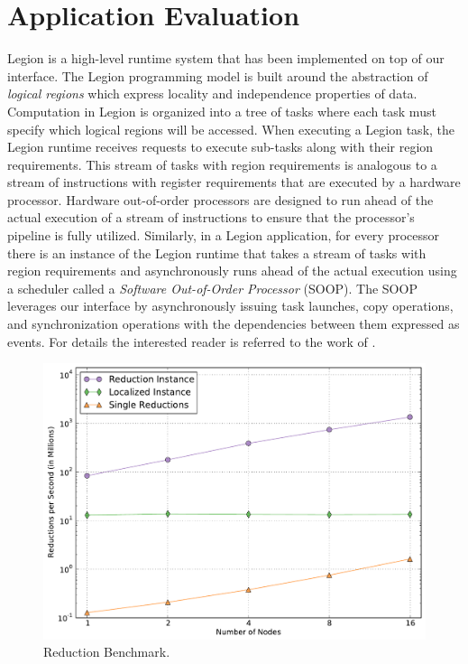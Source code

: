 
\section{Application Evaluation}
\label{sec:apps}
Legion\cite{Legion12} is a high-level runtime system that has been implemented on top
of our interface.  
The Legion programming model is built around the abstraction of 
{\em logical regions} which express locality and independence properties 
of data.  Computation in Legion is organized into a tree of tasks where 
each task must specify which logical regions will be accessed.
When executing a Legion task, the Legion runtime receives requests
to execute sub-tasks along with their region requirements.
This stream of tasks with region requirements is analogous to a stream
of instructions with register requirements that are executed by 
a hardware processor.  Hardware out-of-order processors are designed to
run ahead of the actual execution of a stream of instructions
to ensure that the processor's pipeline is fully utilized.  Similarly, in a
Legion application, for every processor there is an instance of the Legion runtime
that takes a stream of tasks with region requirements and asynchronously
runs ahead of the actual execution using a scheduler called a {\em Software Out-of-Order Processor} 
(SOOP).  The SOOP leverages our interface by asynchronously issuing task launches, copy
operations, and synchronization operations with the dependencies between them expressed
as events.  For details the interested reader is referred to the work of \cite{Legion12}.

\begin{figure}
\begin{center}
\includegraphics[scale=0.33]{figs/reduce_simple.pdf}
\end{center}
\vspace{-2mm}
\caption{Reduction Benchmark.\label{fig:reducbench}}
\vspace{-4mm}
\end{figure}

